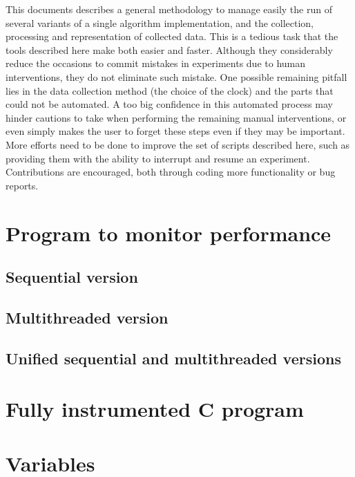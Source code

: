This documents describes a general methodology to manage easily the run of several variants of a single algorithm implementation, and the collection, processing and representation of collected data. This is a tedious task that the tools described here make both easier and faster. Although they considerably reduce the occasions to commit mistakes in experiments due to human interventions, they do not eliminate such mistake. One possible remaining pitfall lies in the data collection method (the choice of the clock) and the parts that could not be automated. A too big confidence in this automated process may hinder cautions to take when performing the remaining manual interventions, or even simply makes the user to forget these steps even if they may be important. More efforts need to be done to improve the set of scripts described here, such as providing them with the ability to interrupt and resume an experiment. Contributions are encouraged, both through coding more functionality or bug reports.

\clearpage
\appendix
\section{Program to monitor performance}
\label{sec:files}
\subsection{Sequential version}
\label{app:sequential}


\subsection{Multithreaded version}
\label{app:parallel}


\subsection{Unified sequential and multithreaded versions}
\label{app:unified}


\section{Fully instrumented C program}
\label{app:instrumented}


\section{Variables}
\label{app:variables}


